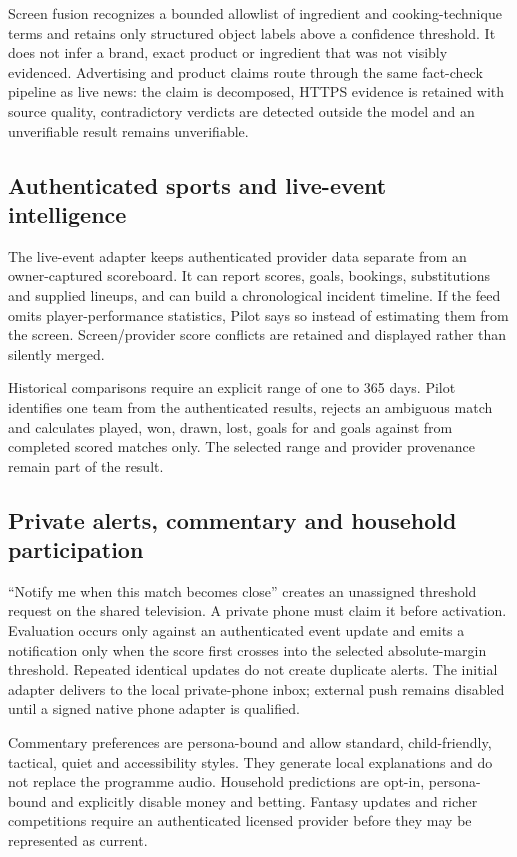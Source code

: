 Screen fusion recognizes a bounded allowlist of ingredient and cooking-technique terms and
retains only structured object labels above a confidence threshold.  It does not infer a
brand, exact product or ingredient that was not visibly evidenced.  Advertising and
product claims route through the same fact-check pipeline as live news: the claim is
decomposed, HTTPS evidence is retained with source quality, contradictory verdicts are
detected outside the model and an unverifiable result remains unverifiable.

\subsection{Authenticated sports and live-event intelligence}

The live-event adapter keeps authenticated provider data separate from an owner-captured
scoreboard.  It can report scores, goals, bookings, substitutions and supplied lineups,
and can build a chronological incident timeline.  If the feed omits player-performance
statistics, Pilot says so instead of estimating them from the screen.  Screen/provider
score conflicts are retained and displayed rather than silently merged.

Historical comparisons require an explicit range of one to 365 days.  Pilot identifies
one team from the authenticated results, rejects an ambiguous match and calculates played,
won, drawn, lost, goals for and goals against from completed scored matches only.  The
selected range and provider provenance remain part of the result.

\subsection{Private alerts, commentary and household participation}

``Notify me when this match becomes close'' creates an unassigned threshold request on the
shared television.  A private phone must claim it before activation.  Evaluation occurs
only against an authenticated event update and emits a notification only when the score
first crosses into the selected absolute-margin threshold.  Repeated identical updates do
not create duplicate alerts.  The initial adapter delivers to the local private-phone
inbox; external push remains disabled until a signed native phone adapter is qualified.

Commentary preferences are persona-bound and allow standard, child-friendly, tactical,
quiet and accessibility styles.  They generate local explanations and do not replace the
programme audio.  Household predictions are opt-in, persona-bound and explicitly disable
money and betting.  Fantasy updates and richer competitions require an authenticated
licensed provider before they may be represented as current.

